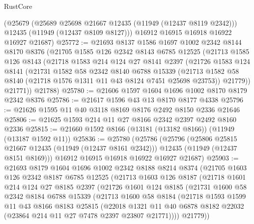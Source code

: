 \begin{lexlean}{RustCore}
\begin{coremodule}
      (@25679
        (@25689 @25698 @21667 @12435 (@11949 (@12437 @8119 @2342)))
        @12435
        (@11949 (@12437 @8109 @8127)))
      @16912
      @16915
      @16918
      @16922
      @16927
      @21687)
@25772 := @21693
    @8137
    @1586
    @1697
    @1002
    @2342
    @8144
    @8170
    @8376
    (@21705
      @1585
      @126
      @2342
      @8143
      @6785
      @12525
      (@21713
        @1585
        @126
        @8143
        (@21718
          @1583
          @214
          @124
          @27
          @8141
          @2397
          (@21726
            @1583
            @124
            @8141
            (@21731
              @1582
              @58
              @2342
              @8140
              @6788
              @15339
              (@21713 @1582 @58 @8140 (@21718 @1576 @1311 @11 @43 @8124 @7451 @25698 @23753))
              @21779))
          @21771))
      @21788)
@25780 := @21606 @1597 @1604 @1696 @1002 @8170 @8179 @2342 @8376
@25786 := @21617 @1596 @43 @13 @8170 @8177 @4338
@25796 := @21626 @1595 @11 @40 @3118 @8169 @8176 @2492 @8150 @2336 @21646
@25806 := @21625 @1593 @214 @11 @27 @8166 @2342 @2397 @2492 @8160 @2336
@25815 := @21660 @1592 @8166 (@13181 (@13182 @8166)) (@11949 (@13187 @1592 @11))
@25836 := @25780
    (@25786
      (@25796
        (@25806 @25815 @21667 @12435 (@11949 (@12437 @8161 @2342)))
        @12435
        (@11949 (@12437 @8151 @8169)))
      @16912
      @16915
      @16918
      @16922
      @16927
      @21687)
@25903 := @21693
    @8179
    @1604
    @1696
    @1002
    @2342
    @8188
    @8214
    @8374
    (@21705
      @1603
      @126
      @2342
      @8187
      @6785
      @12525
      (@21713
        @1603
        @126
        @8187
        (@21718
          @1601
          @214
          @124
          @27
          @8185
          @2397
          (@21726
            @1601
            @124
            @8185
            (@21731
              @1600
              @58
              @2342
              @8184
              @6788
              @15339
              (@21713
                @1600
                @58
                @8184
                (@21718
                  @1593
                  @1599
                  @11
                  @43
                  @8166
                  @8183
                  @25815
                  (@22018
                    @1321
                    @11
                    @40
                    @6878
                    @8182
                    @22032
                    (@23864 @214 @11 @27 @7478 @2397 @23807 @21771))))
              @21779))

\end{coremodule}
\end{lexlean}
